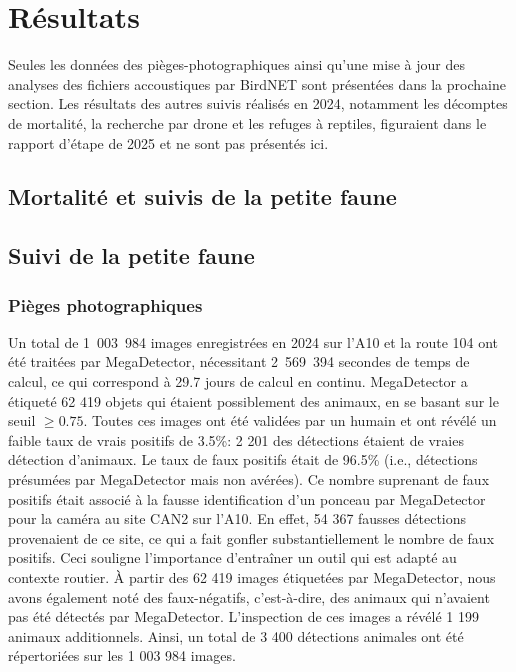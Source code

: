 \section{Résultats}

Seules les données des pièges-photographiques ainsi qu'une mise à jour des analyses des fichiers accoustiques par BirdNET sont présentées dans la prochaine section. Les résultats des autres suivis réalisés en 2024, notamment les décomptes de mortalité, la recherche par drone et les refuges à reptiles, figuraient dans le rapport d'étape de 2025 et ne sont pas présentés ici.

\subsection{Mortalité et suivis de la petite faune}

\subsection{Suivi de la petite faune}

\subsubsection{Pièges photographiques}
Un total de \mbox{1 003 984} images enregistrées en 2024 sur l'A10 et la route 104 ont été traitées par MegaDetector, nécessitant \mbox{2 569 394} secondes de temps de calcul, ce qui correspond à 29.7 jours de calcul en continu. MegaDetector a étiqueté 62 419 objets qui étaient possiblement des animaux, en se basant sur le seuil $\geq 0.75$. Toutes ces images ont été validées par un humain et ont révélé un faible taux de vrais positifs de 3.5\%: 2 201 des détections étaient de vraies détection d'animaux. Le taux de faux positifs était de 96.5\% (i.e., détections présumées par MegaDetector mais non avérées). Ce nombre suprenant de faux positifs était associé à la fausse identification d'un ponceau par MegaDetector pour la caméra au site CAN2 sur l'A10. En effet, 54 367 fausses détections provenaient de ce site, ce qui a fait gonfler substantiellement le nombre de faux positifs. Ceci souligne l'importance d'entraîner un outil qui est adapté au contexte routier. À partir des 62 419 images étiquetées par MegaDetector, nous avons également noté des faux-négatifs, c'est-à-dire, des animaux qui n'avaient pas été détectés par MegaDetector. L'inspection de ces images a révélé 1 199 animaux additionnels. Ainsi, un total de 3 400 détections animales ont été répertoriées sur les 1 003 984 images.

